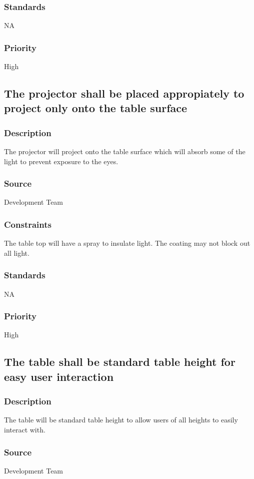 \subsubsection{Standards}
NA
\subsubsection{Priority}
High

\subsection{The projector shall be placed appropiately to project only onto the table surface }
\subsubsection{Description}
The projector will project onto the table surface which will absorb some of the light to prevent exposure to the eyes.
\subsubsection{Source}
Development Team
\subsubsection{Constraints}
The table top will have a spray to insulate light. The coating may not block out all light.
\subsubsection{Standards}
NA
\subsubsection{Priority}
High

\subsection{The table shall be standard table height for easy user interaction }
\subsubsection{Description}
The table will be standard table height to allow users of all heights to easily interact with.
\subsubsection{Source}
Development Team
